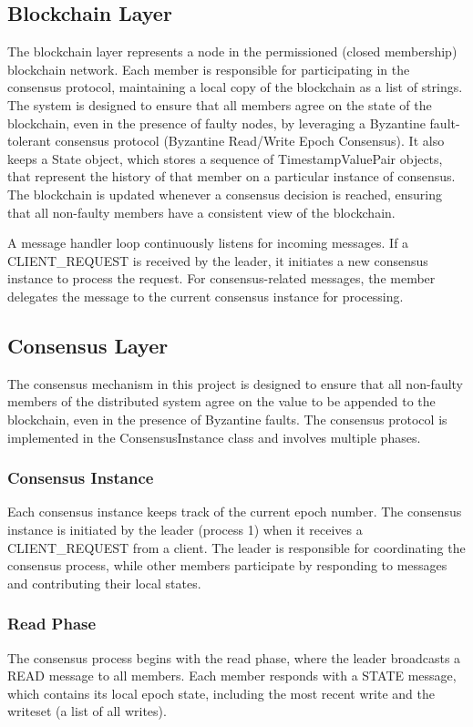 \documentclass[runningheads]{llncs}
\begin{document}
%
\subsection{Blockchain Layer}
The blockchain layer represents a node in the permissioned (closed membership)
blockchain network. Each member is responsible for participating in the
consensus protocol, maintaining a local copy of the blockchain as a list of strings. The system is
designed to ensure that all members agree on the state of the blockchain, even
in the presence of faulty nodes, by leveraging a Byzantine fault-tolerant
consensus protocol (Byzantine Read/Write Epoch Consensus).
It also keeps a State object, which stores a sequence of TimestampValuePair objects, that represent the 
history of that member on a particular instance of consensus.
The blockchain is updated whenever a consensus decision is reached, ensuring
that all non-faulty members have a consistent view of the blockchain.

A message handler loop continuously listens for incoming messages. If a
CLIENT\_REQUEST is received by the leader, it initiates a new
consensus instance to process the request. For consensus-related messages, the
member delegates the message to the current consensus instance for processing.

%
\subsection{Consensus Layer}
The consensus mechanism in this project is designed to ensure that all
non-faulty members of the distributed system agree on the value to be appended
to the blockchain, even in the presence of Byzantine faults. The consensus
protocol is implemented in the ConsensusInstance class and involves multiple
phases.

\subsubsection{Consensus Instance}
Each consensus instance keeps track of the current epoch number. 
The consensus instance is initiated by the leader
(process 1) when it receives a CLIENT\_REQUEST from a client. The leader is
responsible for coordinating the consensus process, while other members
participate by responding to messages and contributing their local states.

\subsubsection{Read Phase}
The consensus process begins with the read phase, where the leader broadcasts a
READ message to all members. Each member responds with a STATE message, which
contains its local epoch state, including the most recent write and the
writeset (a list of all writes).
\end{document}
